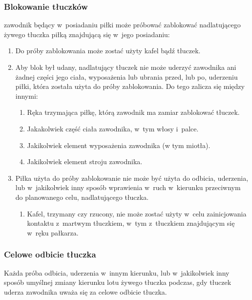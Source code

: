 \documentclass[12pt]{article}
\begin{document}
\subsubsection{Blokowanie tłuczków}

zawodnik będący w~posiadaniu piłki może próbować zablokować
nadlatującego żywego tłuczka piłką znajdującą się w~jego posiadaniu:

\begin{enumerate}
	\item
	      Do próby zablokowania może zostać użyty kafel bądź tłuczek.
	\item
	      Aby blok był udany, nadlatujący tłuczek nie może uderzyć zawodnika ani
	      żadnej części jego ciała, wyposażenia lub ubrania przed, lub po,
	      uderzeniu piłki, która została użyta do próby zablokowania. Do tego
	      zalicza się między innymi:

	      \begin{enumerate}
		      \item
		            Ręka trzymająca piłkę, którą zawodnik ma zamiar zablokować tłuczek.
		      \item
		            Jakakolwiek część ciała zawodnika, w~tym włosy i~palce.
		      \item
		            Jakikolwiek element wyposażenia zawodnika (w tym miotła).
		      \item
		            Jakikolwiek element stroju zawodnika.
	      \end{enumerate}
	\item
	      Piłka użyta do próby zablokowanie nie może być użyta do odbicia,
	      uderzenia, lub w~jakikolwiek inny sposób wprawienia w~ruch w~kierunku
	      przeciwnym do planowanego celu, nadlatującego tłuczka.

	      \begin{enumerate}
		      \item
		            Kafel, trzymany czy rzucony, nie może zostać użyty w~celu
		            zainicjowania kontaktu z~martwym tłuczkiem, w~tym z~tłuczkiem
		            znajdującym się w~ręku pałkarza.
	      \end{enumerate}
\end{enumerate}

\subsubsection{Celowe odbicie tłuczka}

Każda próba odbicia, uderzenia w~innym kierunku, lub w~jakikolwiek inny
sposób umyślnej zmiany kierunku lotu żywego tłuczka podczas, gdy tłuczek
uderza zawodnika uważa się za celowe odbicie tłuczka.
\end{document}
